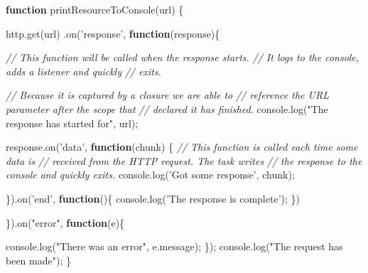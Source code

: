 \documentclass[12pt, ]{article}
\newenvironment{Shaded}{}{}
\newcommand{\KeywordTok}[1]{\textcolor[rgb]{0.00,0.44,0.13}{\textbf{{#1}}}}
\newcommand{\StringTok}[1]{\textcolor[rgb]{0.25,0.44,0.63}{{#1}}}
\newcommand{\CommentTok}[1]{\textcolor[rgb]{0.38,0.63,0.69}{\textit{{#1}}}}
\newcommand{\OtherTok}[1]{\textcolor[rgb]{0.00,0.44,0.13}{{#1}}}
\newcommand{\FunctionTok}[1]{\textcolor[rgb]{0.02,0.16,0.49}{{#1}}}
\newcommand{\NormalTok}[1]{{#1}}
\begin{document}
\begin{Shaded}
\begin{Highlighting}[]
\KeywordTok{function} \FunctionTok{printResourceToConsole}\NormalTok{(url) \{}

   \OtherTok{http}\NormalTok{.}\FunctionTok{get}\NormalTok{(url)}
      \NormalTok{.}\FunctionTok{on}\NormalTok{(}\StringTok{'response'}\NormalTok{, }\KeywordTok{function}\NormalTok{(response)\{}
      
         \CommentTok{// This function will be called when the response starts.}
         \CommentTok{// It logs to the console, adds a listener and quickly }
         \CommentTok{// exits.}
         
         \CommentTok{// Because it is captured by a closure we are able to }
         \CommentTok{// reference the URL parameter after the scope that }
         \CommentTok{// declared it has finished.            }
         \OtherTok{console}\NormalTok{.}\FunctionTok{log}\NormalTok{(}\StringTok{"The response has started for"}\NormalTok{, url);}
      
         \OtherTok{response}\NormalTok{.}\FunctionTok{on}\NormalTok{(}\StringTok{'data'}\NormalTok{, }\KeywordTok{function}\NormalTok{(chunk) \{      }
            \CommentTok{// This function is called each time some data is}
            \CommentTok{// received from the HTTP request. The task writes}
            \CommentTok{// the response to the console and quickly exits.}
            \OtherTok{console}\NormalTok{.}\FunctionTok{log}\NormalTok{(}\StringTok{'Got some response'}\NormalTok{, chunk);}
                   
         \NormalTok{\}).}\FunctionTok{on}\NormalTok{(}\StringTok{'end'}\NormalTok{, }\KeywordTok{function}\NormalTok{()\{}
            \OtherTok{console}\NormalTok{.}\FunctionTok{log}\NormalTok{(}\StringTok{'The response is complete'}\NormalTok{);}
         \NormalTok{\})}
         
      \NormalTok{\}).}\FunctionTok{on}\NormalTok{(}\StringTok{"error"}\NormalTok{, }\KeywordTok{function}\NormalTok{(e)\{}
         
         \OtherTok{console}\NormalTok{.}\FunctionTok{log}\NormalTok{(}\StringTok{"There was an error"}\NormalTok{, }\OtherTok{e}\NormalTok{.}\FunctionTok{message}\NormalTok{);}
      \NormalTok{\});      }
   \OtherTok{console}\NormalTok{.}\FunctionTok{log}\NormalTok{(}\StringTok{"The request has been made"}\NormalTok{);}
\NormalTok{\}   }
\end{Highlighting}
\end{Shaded}
\end{document}

